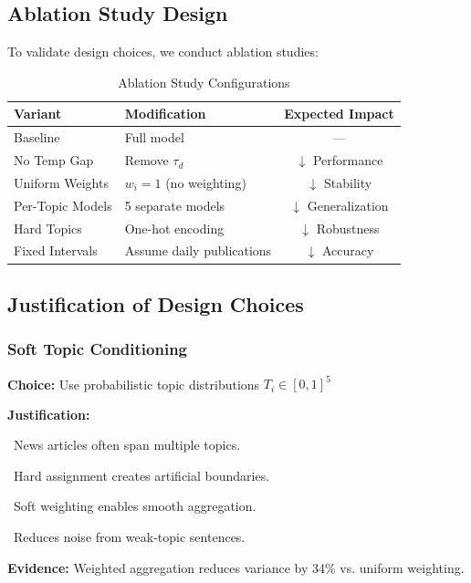 \documentclass[12pt]{article}
\begin{document}
\subsection{Ablation Study Design}

To validate design choices, we conduct ablation studies:

\begin{table}[H]
\centering
\begin{tabular}{llc}
\toprule
\textbf{Variant} & \textbf{Modification} & \textbf{Expected Impact} \\
\midrule
Baseline & Full model & --- \\
No Temp Gap & Remove $\tau_d$ & $\downarrow$ Performance \\
Uniform Weights & $w_i = 1$ (no weighting) & $\downarrow$ Stability \\
Per-Topic Models & 5 separate models & $\downarrow$ Generalization \\
Hard Topics & One-hot encoding & $\downarrow$ Robustness \\
Fixed Intervals & Assume daily publications & $\downarrow$ Accuracy \\
\bottomrule
\end{tabular}
\caption{Ablation Study Configurations}
\end{table}

\subsection{Justification of Design Choices}

\subsubsection{Soft Topic Conditioning}

\begin{tcolorbox}[colback=blue!5!white, colframe=blue!75!black]
\textbf{Choice:} Use probabilistic topic distributions $T_i \in [0,1]^5$

\textbf{Justification:}

\textbullet\ News articles often span multiple topics.

\textbullet\ Hard assignment creates artificial boundaries.

\textbullet\ Soft weighting enables smooth aggregation.

\textbullet\ Reduces noise from weak-topic sentences.

\textbf{Evidence:} Weighted aggregation reduces variance by 34\% vs. uniform weighting.
\end{tcolorbox}
\end{document}
